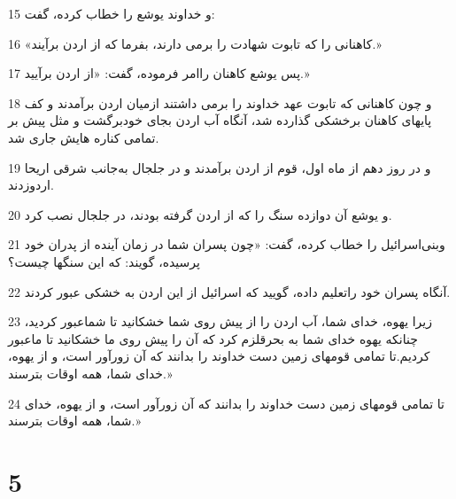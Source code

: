\par 15 و خداوند یوشع را خطاب کرده، گفت:
\par 16 «کاهنانی را که تابوت شهادت را برمی دارند، بفرما که از اردن برآیند.»
\par 17 پس یوشع کاهنان راامر فرموده، گفت: «از اردن برآیید.»
\par 18 و چون کاهنانی که تابوت عهد خداوند را برمی داشتند ازمیان اردن برآمدند و کف پایهای کاهنان برخشکی گذارده شد، آنگاه آب اردن بجای خودبرگشت و مثل پیش بر تمامی کناره هایش جاری شد.
\par 19 و در روز دهم از ماه اول، قوم از اردن برآمدند و در جلجال به‌جانب شرقی اریحا اردوزدند.
\par 20 و یوشع آن دوازده سنگ را که از اردن گرفته بودند، در جلجال نصب کرد.
\par 21 وبنی‌اسرائیل را خطاب کرده، گفت: «چون پسران شما در زمان آینده از پدران خود پرسیده، گویند: که این سنگها چیست؟
\par 22 آنگاه پسران خود راتعلیم داده، گویید که اسرائیل از این اردن به خشکی عبور کردند.
\par 23 زیرا یهوه، خدای شما، آب اردن را از پیش روی شما خشکانید تا شماعبور کردید، چنانکه یهوه خدای شما به بحرقلزم کرد که آن را پیش روی ما خشکانید تا ماعبور کردیم.تا تمامی قومهای زمین دست خداوند را بدانند که آن زورآور است، و از یهوه، خدای شما، همه اوقات بترسند.»
\par 24 تا تمامی قومهای زمین دست خداوند را بدانند که آن زورآور است، و از یهوه، خدای شما، همه اوقات بترسند.»
 
\chapter{5}

